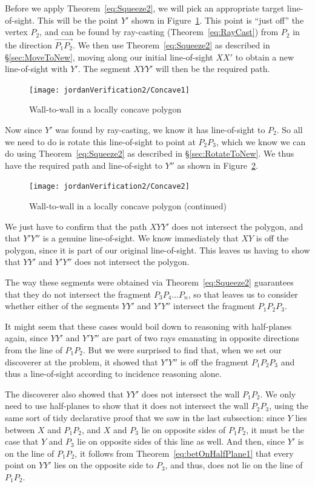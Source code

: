 Before we apply Theorem~\ref{eq:Squeeze2}, we will pick an appropriate target line-of-sight. This will be the point $Y'$ shown in Figure~\ref{fig:Concave1}. This point is ``just off'' the vertex $P_2$, and can be found by ray-casting (Theorem~\ref{eq:RayCast}) from $P_2$ in the direction $\overrightarrow{P_1P_2}$. We then use Theorem~\ref{eq:Squeeze2} as described in \S\ref{sec:MoveToNew}, moving along our initial line-of-sight $XX'$ to obtain a new line-of-sight with $Y'$. The segment $XYY'$ will then be the required path.

\begin{figure}
\centering\texttt{[image: jordanVerification2/Concave1]}
\caption{Wall-to-wall in a locally concave polygon}
\label{fig:Concave1}
\end{figure}

Now since $Y'$ was found by ray-casting, we know it has line-of-sight to $P_2$. So all we need to do is rotate this line-of-sight to point at $P_2P_3$, which we know we can do using Theorem~\ref{eq:Squeeze2} as described in \S\ref{sec:RotateToNew}. We thus have the required path and line-of-sight to $Y''$ as shown in Figure~\ref{fig:Concave2}.

\begin{figure}
\centering\texttt{[image: jordanVerification2/Concave2]}
\caption{Wall-to-wall in a locally concave polygon (continued)}
\label{fig:Concave2}
\end{figure}

We just have to confirm that the path $XYY'$ does not intersect the polygon, and that $Y'Y''$ is a genuine line-of-sight. We know immediately that $XY$ is off the polygon, since it is part of our original line-of-sight. This leaves us having to show that $YY'$ and $Y'Y''$ does not intersect the polygon. 

The way these segments were obtained via Theorem~\ref{eq:Squeeze2} guarantees that they do not intersect the fragment $P_3P_4\ldots P_n$, so that leaves us to consider whether either of the segments $YY'$ and $Y'Y''$ intersect the fragment $P_1P_2P_3$. 

It might seem that these cases would boil down to reasoning with half-planes again, since $YY'$ and $Y'Y''$ are part of two rays emanating in opposite directions from the line of $P_1P_2$. But we were surprised to find that, when we set our discoverer at the problem, it showed that $Y'Y''$ is off the fragment $P_1P_2P_3$ and thus a line-of-sight according to incidence reasoning alone.

The discoverer also showed that $YY'$ does not intersect the wall $P_1P_2$. We only need to use half-planes to show that it does not intersect the wall $P_2P_3$, using the same sort of tidy declarative proof that we saw in the last subsection: since $Y$ lies between $X$ and $P_1P_2$, and $X$ and $P_3$ lie on opposite sides of $P_1P_2$, it must be the case that $Y$ and $P_3$ lie on opposite sides of this line as well. And then, since $Y'$ is on the line of $P_1P_2$, it follows from Theorem~\ref{eq:betOnHalfPlane1} that every point on $YY'$ lies on the opposite side to $P_3$, and thus, does not lie on the line of $P_1P_2$. 

